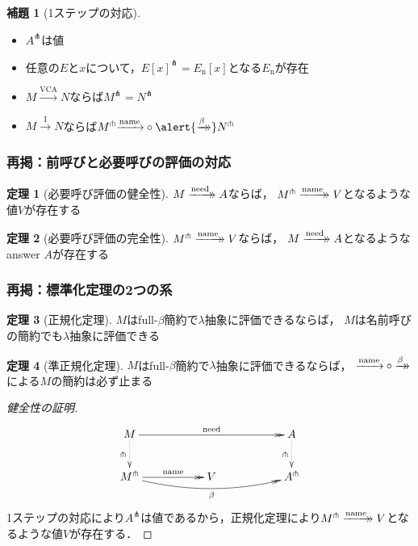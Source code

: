 \documentclass[dvipdfmx,cjk,xcolor=dvipsnames,envcountsect,notheorems,12pt]{beamer}
\theoremstyle{definition}
\newtheorem{theorem}{定理}
\newtheorem{lemma}{補題}
\newcommand{\xtwoheadrightarrow}[2][]{%
  \xrightarrow[#1]{#2}\mathrel{\mkern-14mu}\rightarrow
}
\newcommand{\EXPANDLET}[1]{#1^\pitchfork}
\newcommand{\CALLBYNEEDI}{\xrightarrow{\mathrm{I}}}
\newcommand{\CALLBYNEEDVCA}{\xrightarrow{\mathrm{VCA}}}
\newcommand{\CALLBYNAME}{\xrightarrow{\mathrm{name}}}
\newcommand{\RTCLOSFULLBETA}{\xtwoheadrightarrow{\beta}}
\newcommand{\RTCLOSCALLBYNEED}{\xtwoheadrightarrow{\mathrm{need}}}
\newcommand{\RTCLOSCALLBYNAME}{\xtwoheadrightarrow{\mathrm{name}}}
\begin{document}
\begin{frame}
	\begin{lemma}[1ステップの対応]
	\begin{itemize}
		\item $\EXPANDLET{A}$は値
		\item 任意の$E$と$x$について，$\EXPANDLET{E[x]} = E_\mathrm{n}[x]$となる$E_\mathrm{n}$が存在
		\item $M \CALLBYNEEDVCA N$ならば\alert{$\EXPANDLET{M} = \EXPANDLET{N}$}
		\item $M \CALLBYNEEDI N$ならば$\EXPANDLET{M}{\CALLBYNAME}\circ{\alert{\RTCLOSFULLBETA}} \EXPANDLET{N}$
	\end{itemize}
	\end{lemma}
\end{frame}

\begin{frame}
	\frametitle{再掲：前呼びと必要呼びの評価の対応}
	\Large
	\begin{theorem}[必要呼び評価の健全性]
		$M\RTCLOSCALLBYNEED A$ならば，
		$\EXPANDLET{M}\RTCLOSCALLBYNAME V$となるような値$V$が存在する
	\end{theorem}
	\begin{theorem}[必要呼び評価の完全性]
		$\EXPANDLET{M}\RTCLOSCALLBYNAME V$ならば，
		$M\RTCLOSCALLBYNEED A$となるようなanswer $A$が存在する
	\end{theorem}
\end{frame}

\begin{frame}
	\frametitle{再掲：標準化定理の2つの系}
	\large
	\begin{theorem}[正規化定理]
		$M$はfull-$\beta$簡約で$\lambda$抽象に評価できるならば，
		$M$は名前呼びの簡約でも$\lambda$抽象に評価できる
	\end{theorem}
	\begin{theorem}[準正規化定理]
		$M$はfull-$\beta$簡約で$\lambda$抽象に評価できるならば，
		${\CALLBYNAME}\circ{\RTCLOSFULLBETA}$による$M$の簡約は必ず止まる
	\end{theorem}
\end{frame}

\begin{frame}
	\begin{proof}[健全性の証明]
		\Large
		\[\xymatrix{
			M \ar@{->>}[rrrr]^-{\mathrm{need}} \ar@{.>}[d]_-\pitchfork & & & & A \ar@{.>}[d]_-\pitchfork \\
			\EXPANDLET{M} \ar@/_10pt/@{->>}[rrrr]_-{\beta} \ar@{->>}[rr]^-{\mathrm{name}} & & V & & \EXPANDLET{A}
		} \]
		1ステップの対応により$\EXPANDLET{A}$は値であるから，正規化定理により$\EXPANDLET{M}\RTCLOSCALLBYNAME V$となるような値$V$が存在する．
	\end{proof}
\end{frame}
\end{document}
